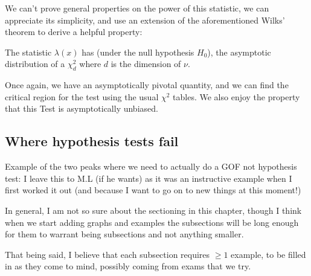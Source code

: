 We can't prove general properties on the power of this statistic, we can appreciate its simplicity, and use an extension of the aforementioned Wilks' theorem to derive a helpful property:

\begin{theorem}
	The statistic $\lambda(x)$ has (under the null hypothesis $H_0$), the asymptotic distribution of a $\chi^2_d$ where $d$ is the dimension of $\nu$.
\end{theorem}

Once again, we have an asymptotically pivotal quantity, and we can find the critical region for the test using the usual $\chi^2$ tables. We also enjoy the property that this Test is asymptotically unbiased.

\subsection{Where hypothesis tests fail}
Example of the two peaks where we need to actually do a GOF not hypothesis test:
I leave this to M.L (if he wants) as it was an instructive example when I first worked it out (and because I want to go on to new things at this moment!)


In general, I am not so sure about the sectioning in this chapter, though I think when we start adding graphs and examples the subsections will be long enough for them to warrant being subsections and not anything smaller. 

That being said, I believe that each subsection requires $\geq1$ example, to be filled in as they come to mind, possibly coming from exams that we try.